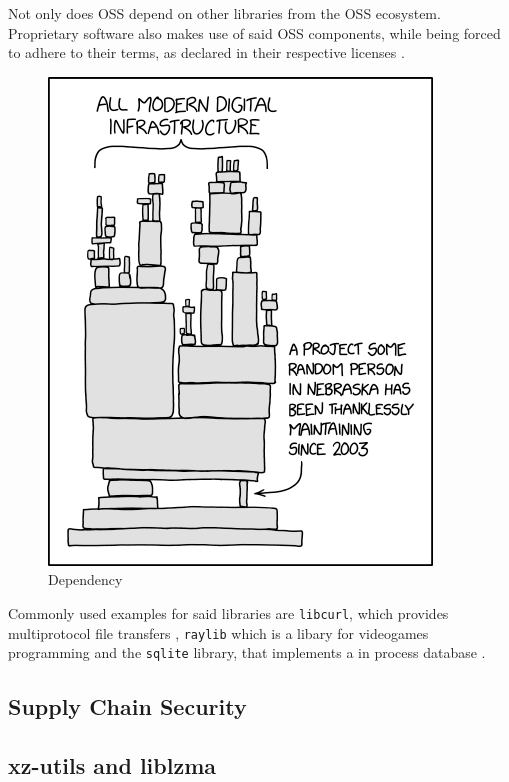Not only does OSS depend on other libraries from the OSS ecosystem. Proprietary
software also makes use of said OSS components, while being forced to adhere to
their terms, as declared in their respective licenses \cite{libcurl2024usage}. 


\begin{figure}[H]
    \includegraphics[scale=0.5]{assets/dependency.png}
    \caption{Dependency \cite{xkcdUnknownDependency}}
    \label{img:dependency}
\end{figure}

Commonly used examples for said libraries are \texttt{libcurl}, which provides
multiprotocol file transfers \cite{libcurl2024overview}, \texttt{raylib} which
is a libary for videogames programming \cite{raylib2024landing} and the
\texttt{sqlite} library, that implements a in process database
\cite{sqlite2024landing}.

\subsection{Supply Chain Security}

\cite{ccc2024supplychainsec}

\subsection{xz-utils and liblzma}

\cite{ccc2024backdoor}
